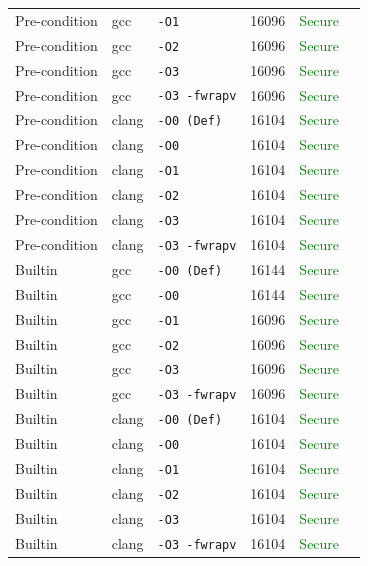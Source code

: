 \begin{table}[htbp]
\begin{tabular}{@{}lllcrl@{}}
Pre-condition & gcc & \texttt{-O1} & 16096 & \textcolor{green}{Secure}} \\
Pre-condition & gcc & \texttt{-O2} & 16096 & \textcolor{green}{Secure}} \\
Pre-condition & gcc & \texttt{-O3} & 16096 & \textcolor{green}{Secure}} \\
Pre-condition & gcc & \texttt{-O3 -fwrapv} & 16096 & \textcolor{green}{Secure}} \\
Pre-condition & clang & \texttt{-O0 (Def)} & 16104 & \textcolor{green}{Secure}} \\
Pre-condition & clang & \texttt{-O0} & 16104 & \textcolor{green}{Secure}} \\
Pre-condition & clang & \texttt{-O1} & 16104 & \textcolor{green}{Secure}} \\
Pre-condition & clang & \texttt{-O2} & 16104 & \textcolor{green}{Secure}} \\
Pre-condition & clang & \texttt{-O3} & 16104 & \textcolor{green}{Secure}} \\
Pre-condition & clang & \texttt{-O3 -fwrapv} & 16104 & \textcolor{green}{Secure}} \\
\midrule
Builtin & gcc & \texttt{-O0 (Def)} & 16144 & \textcolor{green}{Secure}} \\
Builtin & gcc & \texttt{-O0} & 16144 & \textcolor{green}{Secure}} \\
Builtin & gcc & \texttt{-O1} & 16096 & \textcolor{green}{Secure}} \\
Builtin & gcc & \texttt{-O2} & 16096 & \textcolor{green}{Secure}} \\
Builtin & gcc & \texttt{-O3} & 16096 & \textcolor{green}{Secure}} \\
Builtin & gcc & \texttt{-O3 -fwrapv} & 16096 & \textcolor{green}{Secure}} \\
Builtin & clang & \texttt{-O0 (Def)} & 16104 & \textcolor{green}{Secure}} \\
Builtin & clang & \texttt{-O0} & 16104 & \textcolor{green}{Secure}} \\
Builtin & clang & \texttt{-O1} & 16104 & \textcolor{green}{Secure}} \\
Builtin & clang & \texttt{-O2} & 16104 & \textcolor{green}{Secure}} \\
Builtin & clang & \texttt{-O3} & 16104 & \textcolor{green}{Secure}} \\
Builtin & clang & \texttt{-O3 -fwrapv} & 16104 & \textcolor{green}{Secure}} \\
\midrule
\bottomrule \end{tabular} \end{table}

